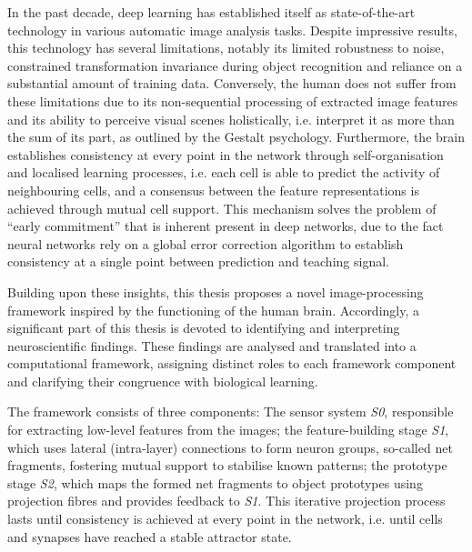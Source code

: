 In the past decade, deep learning has established itself as state-of-the-art technology in various automatic image analysis tasks.
Despite impressive results, this technology has several limitations, notably its limited robustness to noise, constrained transformation invariance during object recognition and reliance on a substantial amount of training data.
Conversely, the human does not suffer from these limitations due to its non-sequential processing of extracted image features and its ability to perceive visual scenes holistically, i.e. interpret it as more than the sum of its part, as outlined by the Gestalt psychology.
Furthermore, the brain establishes consistency at every point in the network through self-organisation and localised learning processes, i.e. each cell is able to predict the activity of neighbouring cells, and a consensus between the feature representations is achieved through mutual cell support. This mechanism solves the problem of ``early commitment'' that is inherent present in deep networks, due to the fact neural networks rely on a global error correction algorithm to establish consistency at a single point between prediction and teaching signal.

Building upon these insights, this thesis proposes a novel image-processing framework inspired by the functioning of the human brain.
Accordingly, a significant part of this thesis is devoted to identifying and interpreting neuroscientific findings.
These findings are analysed and translated into a computational framework, assigning distinct roles to each framework component and clarifying their congruence with biological learning.

The framework consists of three components: The sensor system \emph{S0},  responsible for extracting low-level features from the images; the feature-building stage \emph{S1}, which uses lateral (intra-layer) connections to form neuron groups, so-called net fragments,  fostering mutual support to stabilise known patterns; the prototype stage \emph{S2}, which maps the formed net fragments to object prototypes using projection fibres and provides feedback to \emph{S1}.
This iterative projection process lasts until consistency is achieved at every point in the network, i.e. until cells and synapses have reached a stable attractor state.

